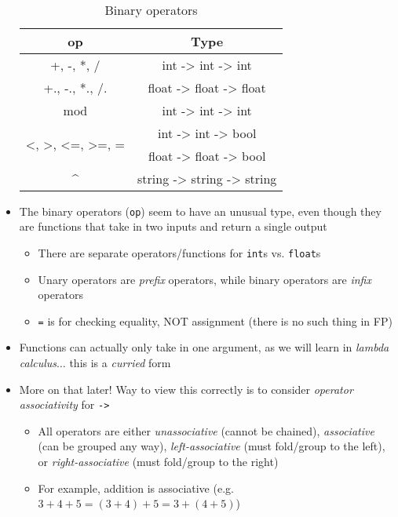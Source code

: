 \begin{itemize}
    \begin{table}[h]
    \caption{Binary operators}
    \centering
    {\tt
        \begin{tabular}{cc}
        op & Type \\
        \hline
        +, -, *, /                       & int -> int -> int \\
        +., -., *., /.                   & float -> float -> float \\
        mod                              & int -> int -> int \\
        \multirow{2}{*}{<, >, <=, >=, =} & int -> int -> bool \\
                                         & float -> float -> bool \\
        \^{}                             & string -> string -> string \\
        \hline
        \end{tabular}
    }
    \end{table}
    \item The binary operators (\texttt{op}) seem to have an unusual type, even though they are functions that take in two inputs and return a single output
    \begin{itemize}
        \item There are separate operators/functions for \texttt{int}s vs. \texttt{float}s
        \item Unary operators are \textit{prefix} operators, while binary operators are \textit{infix} operators
        \item \texttt{=} is for checking equality, NOT assignment (there is no such thing in FP)
    \end{itemize}
    \item Functions can actually only take in one argument, as we will learn in \textit{lambda calculus}$\ldots$ this is a \textit{curried} form
    \item More on that later! Way to view this correctly is to consider \textit{operator associativity} for \texttt{->}
    \begin{itemize}
        \item All operators are either \textit{unassociative} (cannot be chained), \textit{associative} (can be grouped any way), \textit{left-associative} (must fold/group to the left), or \textit{right-associative} (must fold/group to the right)
        \item For example, addition is associative (e.g. $3 + 4 + 5 = (3 + 4) + 5 = 3 + (4 + 5)$)

\end{itemize}
\end{itemize}
